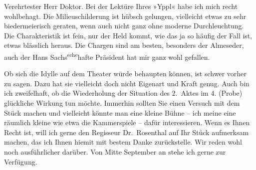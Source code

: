 \pstart\center{}Verehrtester Herr Doktor.\pend\vspace{0.5em}
\pstart
           Bei der Lektüre Ihres »Yppl« habe ich mich recht
               wohlbehagt. Die Milieuschilderung ist hübsch gelungen, vielleicht etwas zu sehr
               biedermeierisch geraten, wenn auch nicht ganz ohne moderne Durchleuchtung. Die
               Charakteristik ist fein, nur der Held kommt, wie das ja so häufig der Fall ist, etwas
               blässlich heraus. Die Chargen sind am besten, besonders der Almeseder, auch der Hans Sachs\substVorne{}\textsuperscript{sche}\substDazwischen{}hafte\substHinten{} Präsident hat mir ganz wohl gefallen.\pend
           
\pstart
           Ob sich die Idylle auf dem Theater würde behaupten können, ist schwer vorher zu
               sagen. Dazu hat sie vielleicht doch nicht Eigenart und Kraft genug. Auch bin ich
               zweifelhaft, ob die Wiederholung der Situation des 2. Aktes im 4. (Probe) glückliche
               Wirkung tun möchte. Immerhin sollten Sie einen Versuch mit dem {\pb}Stück machen und vielleicht
               könnte man eine kleine Bühne – ich meine eine räumlich kleine wie etwa die Kammerspiele – dafür interessieren. Wenn es Ihnen
               Recht ist, will ich gerne den Regisseur Dr. Rosenthal auf Ihr Stück aufmerksam machen, das ich Ihnen hiemit mit bestem Danke zurückstelle.
               Wir reden wohl noch ausführlicher darüber. Von Mitte September an stehe
               ich gerne zur Verfügung.\pend
           
